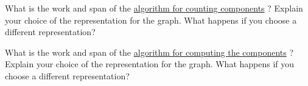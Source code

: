 \begin{exercise}
What is the work and span of the
%
\href{alg:graphcon::connect::cc}{algorithm for counting components}
?
%
Explain your choice of the representation for the graph. 
%
What happens if you choose a different representation?
\end{exercise}
%

\begin{exercise}
What is the work and span of the
%
\href{alg:graphcon::connect::nc}{algorithm for computing the components}
?
%
Explain your choice of the representation for the graph.
%
What happens if you choose a different representation?
\end{exercise}
